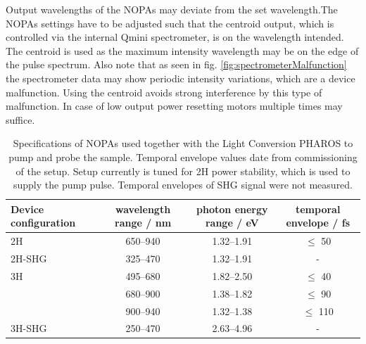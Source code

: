 \documentclass[twoside,openright]{scrreprt}
\begin{document}
Output wavelengths of the NOPAs may deviate from the set wavelength.The NOPAs settings have to be adjusted such that the centroid output, which is controlled via the internal Qmini spectrometer, is on the wavelength intended. The centroid is used as the maximum intensity wavelength may be on the edge of the pulse spectrum. Also note that as seen in fig. \ref{fig:spectrometerMalfunction} the spectrometer data may show periodic intensity variations, which are a device malfunction. Using the centroid avoids strong interference by this type of malfunction. In case of low output power resetting motors multiple times may suffice.

\begin{table}
\caption{Specifications of NOPAs used together with the Light Conversion PHAROS to pump and probe the sample. Temporal envelope values date from commissioning of the setup. Setup currently is tuned for 2H power stability, which is used to supply the pump pulse. Temporal envelopes of SHG signal were not measured.\label{tab:NOPAs}}
\begin{tabular}{lccc}\toprule
Device configuration & wavelength range / nm & photon energy range / eV & temporal envelope / fs \\ \midrule
2H & \SIrange{650}{940}{} & \SIrange{1.32}{1.91}{} & $\leq$ 50 \\ 
2H-SHG & \SIrange{325}{470}{} & \SIrange{1.32}{1.91}{} & - \\\midrule
3H & \SIrange{495}{680}{} & \SIrange{1.82}{2.50}{} & $\leq$ 40 \\
& \SIrange{680}{900}{} & \SIrange{1.38}{1.82}{} & $\leq$ 90 \\
& \SIrange{900}{940}{} & \SIrange{1.32}{1.38}{} & $\leq$ 110 \\
3H-SHG& \SIrange{250}{470}{} & \SIrange{2.63}{4.96}{} & - \\
\end{tabular}
\end{table}
\end{document}
